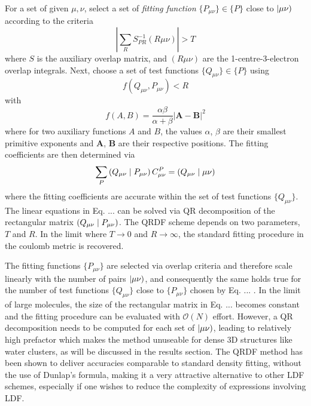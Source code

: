 For a set of given $\mu,\nu$, select a set of \emph{fitting function} $\{P_{\mu\nu}\} \in \{P\}$ close to $\left\lvert \mu\nu \right)$ according to the criteria
\begin{equation}
\left\lvert \sum_R S_{PR}^{-1} (R\mu\nu) \right\rvert > T 
\end{equation} 
\noindent where $S$ is the auxiliary overlap matrix, and $(R\mu\nu)$ are the 1-centre-3-electron overlap integrals. Next, choose a set of test functions $\{Q_{\mu\nu}\} \in \{P\}$ using
\begin{equation}
f(Q_{\mu\nu},P_{\mu\nu}) < R
\end{equation}
\noindent with
\begin{equation}
f(A,B) = \frac{\alpha \beta}{\alpha + \beta} \left\lvert \mathbf{A} - \mathbf{B} \right\rvert^2
\end{equation}
\noindent where for two auxiliary functions $A$ and $B$, the values $\alpha$, $\beta$ are their smallest primitive exponents and $\mathbf{A}$, $\mathbf{B}$ are their respective positions. The fitting coefficients are then determined via
\begin{equation}
\sum_P \left( Q_{\mu\nu} \mid P_{\mu\nu} \right) C^P_{\mu\nu} = \left( Q_{\mu\nu} \mid \mu\nu \right)
\end{equation}
\noindent where the fitting coefficients are accurate within the set of test functions $\{Q_{\mu\nu}\}$. The linear equations in Eq. ... can be solved via QR decomposition of the rectangular matrix $\left( Q_{\mu\nu} \mid P_{\mu\nu} \right)$.
The QRDF scheme depends on two parameters, $T$ and $R$. In the limit where $T \rightarrow 0$ and $R \rightarrow \infty$, the standard fitting procedure in the coulomb metric is recovered. 

The fitting functions $\{P_{\mu\nu}\}$ are selected via overlap criteria and therefore scale linearly with the number of pairs $\left\lvert \mu\nu \right)$, and consequently the same holds true for the number of test functions $\{Q_{\mu\nu}\}$ close to $\{P_{\mu\nu}\}$ chosen by Eq. ... . In the limit of large molecules, the size of the rectangular matrix in Eq. ... becomes constant and the fitting procedure can be evaluated with $\mathcal{O}(N)$ effort. However, a QR decomposition needs to be computed for each set of $\left\lvert \mu\nu \right)$, leading to relatively high prefactor which makes the method unuseable for dense 3D structures like water clusters, as will be discussed in the results section.
The QRDF method has been shown to deliver accuracies comparable to standard density fitting, without the use of Dunlap's formula, making it a very attractive alternative to other LDF schemes, especially if one wishes to reduce the complexity of expressions involving LDF.

